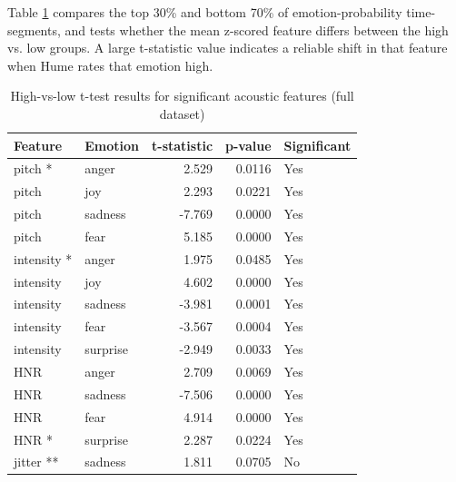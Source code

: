 \medskip
Table \ref{tab:ttest_full_features} compares the top 30\% and bottom 70\% of emotion-probability time-segments, and tests whether the mean z-scored feature differs between the high vs. low groups. 
A large t-statistic value indicates a reliable shift in that feature when Hume rates that emotion high. 

\begin{table}[H]
    \centering
    \begin{tabular}{l l r r l}
      \toprule
      \textbf{Feature} & \textbf{Emotion} & \textbf{t-statistic} & \textbf{p-value} & \textbf{Significant} \\
      \midrule
        pitch *     & anger   &  2.529      & 0.0116    & Yes         \\
        pitch       & joy     &  2.293      & 0.0221    & Yes         \\
        pitch       & sadness & -7.769      & 0.0000    & Yes         \\
        pitch       & fear    &  5.185      & 0.0000    & Yes         \\
        intensity * & anger   &  1.975      & 0.0485    & Yes         \\
        intensity   & joy     &  4.602      & 0.0000    & Yes         \\
        intensity   & sadness & -3.981      & 0.0001    & Yes         \\
        intensity   & fear    & -3.567      & 0.0004    & Yes         \\
        intensity   & surprise& -2.949      & 0.0033    & Yes         \\
        HNR         & anger   &  2.709      & 0.0069    & Yes         \\
        HNR         & sadness & -7.506      & 0.0000    & Yes         \\
        HNR         & fear    &  4.914      & 0.0000    & Yes         \\
        HNR *       & surprise&  2.287      & 0.0224    & Yes         \\
        jitter **   & sadness &  1.811      & 0.0705    & No          \\
      \bottomrule
    \end{tabular}
    \caption{High-vs-low t-test results for significant acoustic features (full dataset)}
    \label{tab:ttest_full_features}
  \end{table}
  
